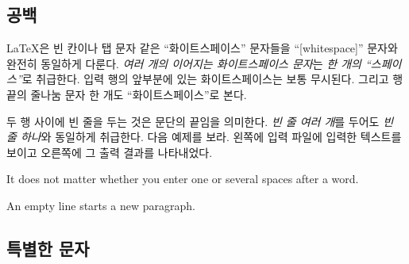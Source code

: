 \subsection{공백}

\LaTeX 은 빈 칸이나 탭 문자 같은 ``화이트스페이스'' 문자들을 ``[whitespace]'' 문자와 완전히 동일하게 다룬다.
\emph{여러 개의 이어지는 화이트스페이스 문자}는 \emph{한 개의 ``스페이스''}로 취급한다.
입력 행의 앞부분에 있는 화이트스페이스는 보통 무시된다. 그리고 행 끝의 줄나눔 문자 한 개도 ``화이트스페이스''로 본다.

두 행 사이에 빈 줄을 두는 것은 문단의 끝임을 의미한다. \emph{빈 줄 여러 개}를 두어도 \emph{빈 줄 하나}와 동일하게 취급한다.
다음 예제를 보라. 왼쪽에 입력 파일에 입력한 텍스트를 보이고 오른쪽에 그 출력 결과를 나타내었다.


\begin{example}
It does not matter whether you
enter one or several     spaces
after a word.

An empty line starts a new
paragraph.
\end{example}

\subsection{특별한 문자}

